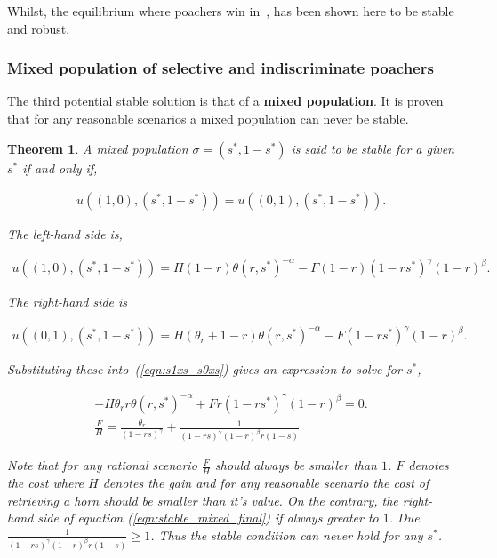 \documentclass[10pt]{article}
\newtheorem{theorem}{Theorem}
\begin{document}
Whilst, the equilibrium where  poachers win in~\cite{Lee}, has been shown here
to be stable and robust.

\subsubsection{Mixed population of selective and indiscriminate poachers}

The third potential stable solution is that of a \textbf{mixed population}.
It is proven that for any reasonable scenarios a mixed population can never 
be stable.

\begin{theorem}
	A mixed population \(\sigma = (s^*, 1 - s^*)\) is said to be stable for a
	given \(s^*\) if and only if,

	\begin{eqnarray}
	\label{eqn:s1xs_s0xs}
	u((1, 0),(s^*, 1 - s^*)) = u((0, 1),(s^*, 1 - s^*)).
	\end{eqnarray}

	The left-hand side is,

	\begin{eqnarray} \nonumber
	u((1, 0),(s^*, 1 - s^*)) =
	H(1 - r) \theta(r, s^*)^{-\alpha} - F (1 - r)(1 - rs^*)^{\gamma}(1 - r)^{\beta} .
	\end{eqnarray}

	The right-hand side is

	\begin{eqnarray} \nonumber
	u((0, 1),(s^*, 1 - s^*)) =
	H(\theta_r + 1 - r)\theta(r, s^*)^{-\alpha} - F(1 - rs^*)^{\gamma}(1 - r)^{\beta} .
	\end{eqnarray}

	Substituting these into~(\ref{eqn:s1xs_s0xs}) gives an expression to solve 
	for \(s^*\),

	\begin{eqnarray}
	\label{eqn:stablemixed}
	- H \theta_r r \theta(r, s^*)^{-\alpha}  + F r (1 - rs^*)^{\gamma}(1 - r)^{\beta} = 0.
	\\
	\label{eqn:stable_mixed_final}
	\frac{F}{H} = \frac{\theta_r}{(1 - rs) ^ {\gamma}} + \frac{1}{(1 - rs) ^ \gamma
	(1- r) ^ {\beta} r (1- s)}
	\end{eqnarray}

	Note that for any rational scenario \(\frac{F}{H}\) should always be smaller
	than \(1\). \(F\) denotes the cost where \(H\) denotes the gain and for any
	reasonable scenario the cost of retrieving a horn should be smaller than it's
	value. On the contrary, the right-hand side of equation (\ref{eqn:stable_mixed_final})
	if always greater to \(1\). Due \(\frac{1}{(1 - rs) ^ \gamma(1- r) ^ {\beta} 
	r (1- s)} \geq 1\). Thus the stable condition can never hold for any \(s^*\).
\end{theorem}
\end{document}

